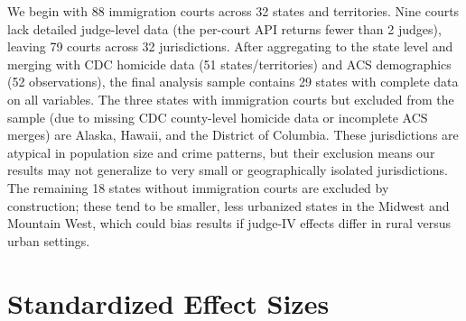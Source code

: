 \documentclass[12pt]{article}
\begin{document}
We begin with 88 immigration courts across 32 states and territories. Nine courts lack detailed judge-level data (the per-court API returns fewer than 2 judges), leaving 79 courts across 32 jurisdictions. After aggregating to the state level and merging with CDC homicide data (51 states/territories) and ACS demographics (52 observations), the final analysis sample contains 29 states with complete data on all variables. The three states with immigration courts but excluded from the sample (due to missing CDC county-level homicide data or incomplete ACS merges) are Alaska, Hawaii, and the District of Columbia. These jurisdictions are atypical in population size and crime patterns, but their exclusion means our results may not generalize to very small or geographically isolated jurisdictions. The remaining 18 states without immigration courts are excluded by construction; these tend to be smaller, less urbanized states in the Midwest and Mountain West, which could bias results if judge-IV effects differ in rural versus urban settings.

\section{Standardized Effect Sizes}
\label{sec:sde}


\end{document}
